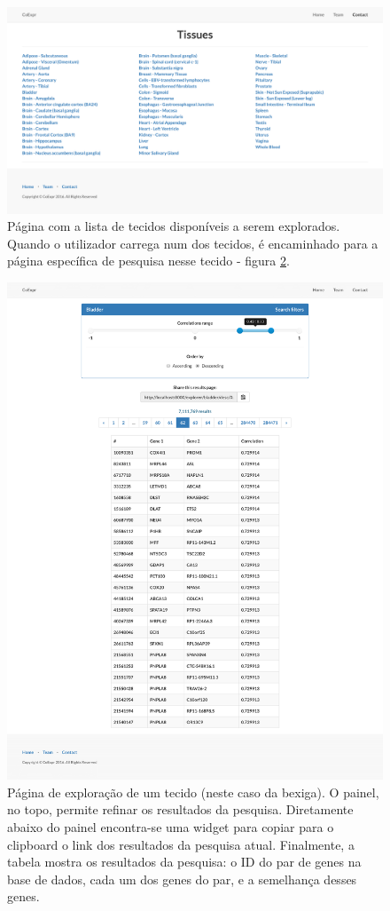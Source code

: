 \begin{figure}[ht]
    \centering
    \includegraphics[width=1\linewidth]{res/tissues.png}
    \caption{Página com a lista de tecidos disponíveis a serem explorados. Quando o utilizador carrega num dos tecidos, é encaminhado para a página específica de pesquisa nesse tecido - figura \ref{fig:tissuePage}.}
    \label{fig:tissueSelection}
\end{figure}

\begin{figure}[ht]
    \centering
    \includegraphics[width=1\linewidth]{res/tissue.png}
    \caption{Página de exploração de um tecido (neste caso da bexiga). O painel, no topo, permite refinar os resultados da pesquisa. Diretamente abaixo do painel encontra-se uma widget para copiar para o clipboard o link dos resultados da pesquisa atual. Finalmente, a tabela mostra os resultados da pesquisa: o ID do par de genes na base de dados, cada um dos genes do par, e a semelhança desses genes.}
    \label{fig:tissuePage}
\end{figure}
